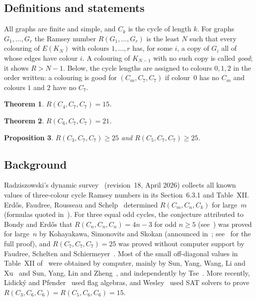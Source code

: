 \documentclass[11pt]{amsart}
\newtheorem{theorem}{Theorem}
\newtheorem{proposition}[theorem]{Proposition}
\theoremstyle{definition}
\theoremstyle{remark}
\begin{document}
\subsection*{Definitions and statements}
All graphs are finite and simple, and $C_k$ is the cycle of length $k$. For graphs $G_1,\dots,G_r$ the Ramsey number
$R(G_1,\dots,G_r)$ is the least $N$ such that every colouring of $E(K_N)$ with colours $1,\dots,r$ has, for some $i$, a copy of
$G_i$ all of whose edges have colour $i$. A colouring of $K_{N-1}$ with no such copy is called \emph{good}; it shows $R>N-1$.
Below, the cycle lengths are assigned to colours $0,1,2$ in the order written: a colouring is good for
$(C_m,C_7,C_7)$ if colour~$0$ has no $C_m$ and colours $1$ and $2$ have no $C_7$.

\begin{theorem}\label{thm:main}
$R(C_4,C_7,C_7)=15$.
\end{theorem}

\begin{theorem}\label{thm:c6}
$R(C_6,C_7,C_7)=21$.
\end{theorem}

\begin{proposition}\label{prop:odd}
$R(C_3,C_7,C_7)\ge 25$ and $R(C_5,C_7,C_7)\ge 25$.
\end{proposition}

\subsection*{Background}
Radziszowski's dynamic survey~\cite{Rad} (revision~18, April 2026) collects all known values of three-colour cycle Ramsey numbers
in its Section~6.3.1 and Table~XII. Erd\H{o}s, Faudree, Rousseau and Schelp~\cite{EFRS1} determined $R(C_m,C_n,C_k)$ for
large~$m$ (formulas quoted in~\cite[6.3.1(a)]{Rad}). For three equal odd cycles, the conjecture attributed to Bondy and Erd\H{o}s
that $R(C_n,C_n,C_n)=4n-3$ for odd $n\ge5$ (see~\cite[6.3.1]{Rad}) was proved for large~$n$ by Kohayakawa, Simonovits and Skokan
(announced in~\cite{KoSS1}; see~\cite[6.3.1]{Rad} for the full proof), and $R(C_7,C_7,C_7)=25$ was proved without computer
support by Faudree, Schelten and Schiermeyer~\cite{FSS3}. Most of the small off-diagonal values in Table~XII of~\cite{Rad} were
obtained by computer, mainly by Sun, Yang, Wang, Li and Xu~\cite{SunYWLX} and Sun, Yang, Lin and Zheng~\cite{SunYLZ2}, and
independently by Tse~\cite{Tse3}. More recently, Lidick\'y and Pfender~\cite{LidP} used flag algebras, and Wesley~\cite{We3}
used SAT solvers to prove $R(C_3,C_6,C_6)=R(C_5,C_6,C_6)=15$.
\end{document}
